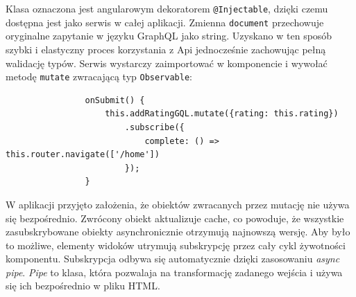 			Klasa oznaczona jest angularowym dekoratorem \verb|@Injectable|, dzięki czemu dostępna jest jako serwis w całej aplikacji.
			Zmienna \verb|document| przechowuje oryginalne zapytanie w języku GraphQL jako string.
			Uzyskano w ten sposób szybki i elastyczny proces korzystania z Api jednocześnie zachowując pełną walidację typów.
			Serwis wystarczy zaimportować w komponencie i wywołać metodę \verb|mutate| zwracającą typ \verb|Observable|:
			\begin{lstlisting}
				onSubmit() {
					this.addRatingGQL.mutate({rating: this.rating})
						.subscribe({
							complete: () => this.router.navigate(['/home'])
						});
				}
			\end{lstlisting}

			W aplikacji przyjęto założenia, że obiektów zwracanych przez mutację nie używa się bezpośrednio.
			Zwrócony obiekt aktualizuje cache, co powoduje, że wszystkie zasubskrybowane obiekty asynchronicznie otrzymują najnowszą wersję.
			Aby było to możliwe, elementy widoków utrymują subskrypcję przez cały cykl żywotności komponentu.
			Subskrypcja odbywa się automatycznie dzięki zasosowaniu \emph{async pipe}.
			\emph{Pipe} to klasa, która pozwalaja na transformację zadanego wejścia i używa się ich bezpośrednio w pliku HTML.
			
